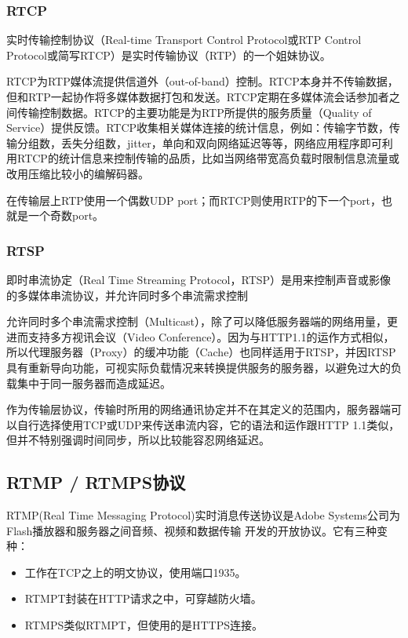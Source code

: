 \documentclass[bachelor]{thesis-uestc}
\begin{document}
\subsubsection{RTCP}
\par 实时传输控制协议（Real-time Transport Control Protocol或RTP Control Protocol或简写RTCP）是实时传输协议（RTP）的一个姐妹协议。

\par RTCP为RTP媒体流提供信道外（out-of-band）控制。RTCP本身并不传输数据，但和RTP一起协作将多媒体数据打包和发送。RTCP定期在多媒体流会话参加者之间传输控制数据。RTCP的主要功能是为RTP所提供的服务质量（Quality of Service）提供反馈。RTCP收集相关媒体连接的统计信息，例如：传输字节数，传输分组数，丢失分组数，jitter，单向和双向网络延迟等等，网络应用程序即可利用RTCP的统计信息来控制传输的品质，比如当网络带宽高负载时限制信息流量或改用压缩比较小的编解码器。

\par 在传输层上RTP使用一个偶数UDP port；而RTCP则使用RTP的下一个port，也就是一个奇数port。

\subsubsection{RTSP}
\par 即时串流协定（Real Time Streaming Protocol，RTSP）是用来控制声音或影像的多媒体串流协议，并允许同时多个串流需求控制

\par 允许同时多个串流需求控制（Multicast），除了可以降低服务器端的网络用量，更进而支持多方视讯会议（Video Conference）。因为与HTTP1.1的运作方式相似，所以代理服务器（Proxy）的缓冲功能（Cache）也同样适用于RTSP，并因RTSP具有重新导向功能，可视实际负载情况来转换提供服务的服务器，以避免过大的负载集中于同一服务器而造成延迟。

\par 作为传输层协议，传输时所用的网络通讯协定并不在其定义的范围内，服务器端可以自行选择使用TCP或UDP来传送串流内容，它的语法和运作跟HTTP 1.1类似，但并不特别强调时间同步，所以比较能容忍网络延迟。


\subsection{RTMP / RTMPS协议}
\par RTMP(Real Time Messaging Protocol)实时消息传送协议是Adobe Systems公司为Flash播放器和服务器之间音频、视频和数据传输 开发的开放协议。它有三种变种：

\begin{itemize}
	\item 工作在TCP之上的明文协议，使用端口1935。
	\item RTMPT封装在HTTP请求之中，可穿越防火墙。
	\item RTMPS类似RTMPT，但使用的是HTTPS连接。
\end{itemize}
\end{document}
